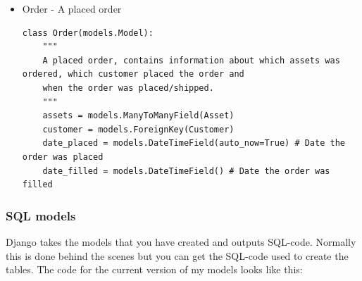 \documentclass[12pt, a4paper,titlepage]{article}
\begin{document}
\begin{itemize}
\item Order - A placed order
\begin{lstlisting}
class Order(models.Model):
    """
    A placed order, contains information about which assets was ordered, which customer placed the order and
    when the order was placed/shipped.
    """
    assets = models.ManyToManyField(Asset)
    customer = models.ForeignKey(Customer)
    date_placed = models.DateTimeField(auto_now=True) # Date the order was placed
    date_filled = models.DateTimeField() # Date the order was filled 
\end{lstlisting}
\end{itemize}

\subsubsection{SQL models}
Django takes the models that you have created and outputs SQL-code.
Normally this is done behind the scenes but you can get the SQL-code used
to create the tables. The code for the current version of my models looks like
this:
\end{document}
